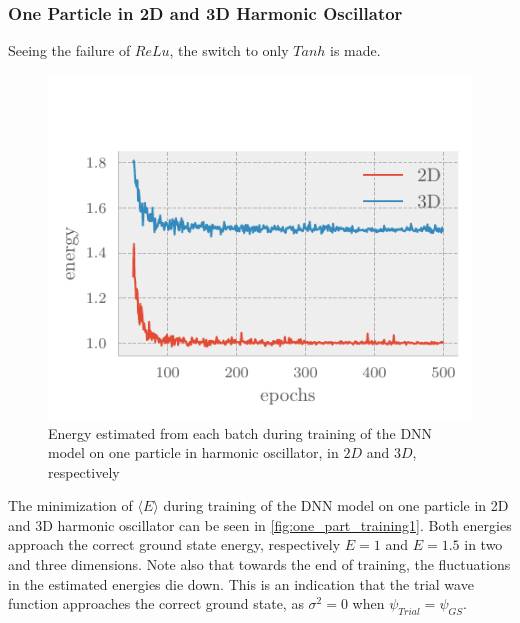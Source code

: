 \subsubsection{One Particle in 2D and 3D Harmonic Oscillator}

Seeing the failure of $ReLu$, the switch to only $Tanh$ is made.

\begin{figure}[H]
	\includegraphics[]{figures/one_part_training2.pdf}
	\caption{Energy estimated from each batch during training of the DNN model on one particle in harmonic oscillator, in $2D$ and $3D$, respectively}
	\label{fig:one_part_training2}
\end{figure}

The minimization of $\langle E \rangle$ during training of the DNN model on one particle in 2D and 3D harmonic oscillator can be seen in \autoref{fig:one_part_training1}. Both energies approach the correct ground state energy, respectively $E=1$ and $E=1.5$ in two and three dimensions. Note also that towards the end of training, the fluctuations in the estimated energies die down. This is an indication that the trial wave function approaches the correct ground state, as $\sigma^2 = 0$ when $\psi_{Trial} = \psi_{GS}$.  




